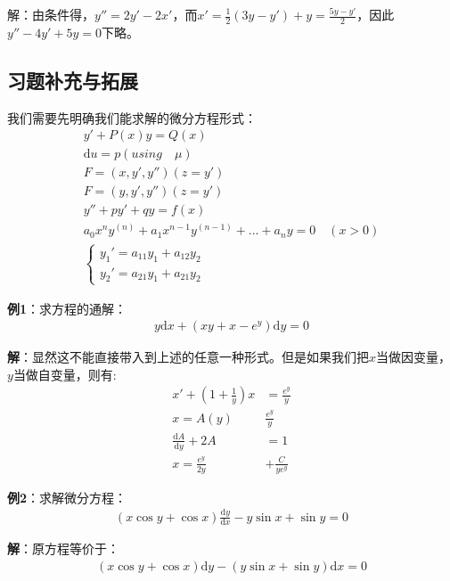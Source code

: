 \documentclass{ctexart}
\let\oldtextbf\textbf
\renewcommand{\textbf}[1]{\textcolor{brown!50!red}{\oldtextbf{#1}}}
\begin{document}
解：由条件得，$y''=2y'-2x'$，而$x'=\frac{1}{2}(3y-y')+y=\frac{5y-y'}{2}$，因此$y''-4y'+5y=0$下略。

\subsection{习题补充与拓展}
\begin{tcolorbox}[
    colback=bac1,     %
    colframe=fra1,   %
    coltitle=white,             %
    coltext=tex1,
    title=可解的微分方程,
    fonttitle=\bfseries,        %
arc=3mm,                     %
breakable
]
我们需要先明确我们能求解的微分方程形式：
\begin{gather*}
    y'+P(x)y=Q(x)\\
\mathrm{d}u=p(using \quad \mu)\\
F=(x,y',y'')(z=y')\\
F=(y,y',y'')(z=y')\\
y''+py'+qy=f(x)\\
a_0x^ny^{(n)}+a_1x^{n-1}y^{(n-1)}+...+a_ny=0\quad(x>0)\\
\begin{cases}
y_1'=a_{11}y_1+a_{12}y_2\\
y_2'=a_{21}{y_1}+a_{21}y_2
\end{cases}
\end{gather*}
\end{tcolorbox}

\textbf{\color{brown!50!red}例1}：求方程的通解：
\begin{align*}
    y\mathrm{d}x+(xy+x-e^y)\mathrm{d}y=0
\end{align*}

\textbf{\color{brown!50!red}解}：显然这不能直接带入到上述的任意一种形式。但是如果我们把$x$当做因变量，$y$当做自变量，则有:
\begin{align*}
   x'+(1+\frac{1}{y})x&=\frac{e^y}{y}\\
x=A(y)&\frac{e^{y}}{y} \\
 \frac{\mathrm{d}A}{\mathrm{d}y }+2A&=1\\
x=\frac{e^y}{2y}&+\frac{C}{ye^y} 
\end{align*}

\textbf{\color{brown!50!red}例2}：求解微分方程：
\begin{align*}
    (x\cos y+\cos x)\frac{\mathrm{d}y}{\mathrm{d}x}-y\sin x+\sin y=0
\end{align*}

\textbf{\color{brown!50!red}解}：原方程等价于：
\begin{align*}
    (x\cos y+\cos x){\mathrm{d}y}-(y\sin x+\sin y)\mathrm{d}x=0
\end{align*}
\end{document}
